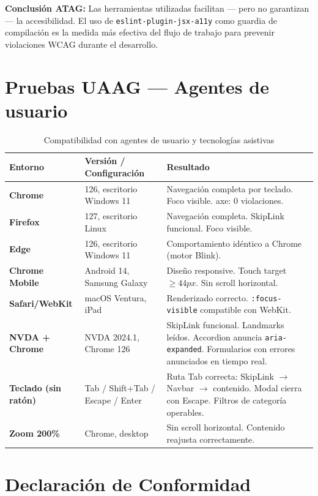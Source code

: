 \documentclass[12pt, a4paper]{report}
\begin{document}
\textbf{Conclusión ATAG:} Las herramientas utilizadas facilitan --- pero no garantizan --- la accesibilidad. El uso de \texttt{eslint-plugin-jsx-a11y} como guardia de compilación es la medida más efectiva del flujo de trabajo para prevenir violaciones WCAG durante el desarrollo.

\section{Pruebas UAAG --- Agentes de usuario}

\begin{table}[H]
\centering
\caption{Compatibilidad con agentes de usuario y tecnologías asistivas}
\label{tab:uaag}
\small
\begin{tabular}{@{}>{\bfseries}p{3.5cm} p{4cm} p{6cm}@{}}
\toprule
\rowcolor{royalblue!12}
\textbf{Entorno} & \textbf{Versión / Configuración} & \textbf{Resultado} \\
\midrule
Chrome & 126, escritorio Windows 11 & Navegación completa por teclado. Foco visible. axe: 0 violaciones. \\
Firefox & 127, escritorio Linux & Navegación completa. SkipLink funcional. Foco visible. \\
Edge & 126, escritorio Windows 11 & Comportamiento idéntico a Chrome (motor Blink). \\
Chrome Mobile & Android 14, Samsung Galaxy & Diseño responsive. Touch target $\geq 44px$. Sin scroll horizontal. \\
Safari/WebKit & macOS Ventura, iPad & Renderizado correcto. \texttt{:focus-visible} compatible con WebKit. \\
\midrule
NVDA + Chrome & NVDA 2024.1, Chrome 126 & SkipLink funcional. Landmarks leídos. Accordion anuncia \texttt{aria-expanded}. Formularios con errores anunciados en tiempo real. \\
Teclado (sin ratón) & Tab / Shift+Tab / Escape / Enter & Ruta Tab correcta: SkipLink $\rightarrow$ Navbar $\rightarrow$ contenido. Modal cierra con Escape. Filtros de categoría operables. \\
Zoom 200\% & Chrome, desktop & Sin scroll horizontal. Contenido reajusta correctamente. \\
\bottomrule
\end{tabular}
\end{table}

\section{Declaración de Conformidad}
\end{document}
